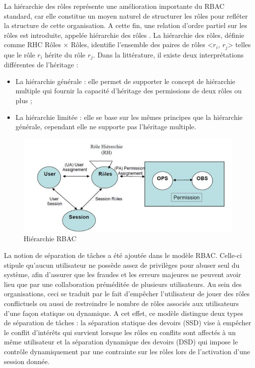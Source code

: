 \label{sectionHiérarchieRole}

La hiérarchie des rôles représente une amélioration importante du RBAC standard, car elle constitue un moyen naturel de structurer les rôles pour refléter la structure de cette organisation. A cette fin, une relation d'ordre partiel sur les rôles est introduite, appelée hiérarchie des rôles \cite{theseBenoit}. La hiérarchie des rôles, définie comme RHC Rôles × Rôles, identifie l'ensemble des paires de rôles <$r_{i}$, $r_{j}$> telles que le rôle $r_{i}$ hérite du rôle $r_{j}$. Dans la littérature, il existe deux interprétations différentes de l'héritage :
\begin{itemize}
\item La hiérarchie générale : elle permet de supporter le concept de hiérarchie multiple qui fournir la capacité d'héritage des permissions de deux rôles ou plus ;
\item La hiérarchie limitée : elle se base sur les mêmes principes que la hiérarchie générale, cependant elle ne supporte pas l'héritage multiple.
\end{itemize}

\begin{figure}[h!]
    \centering
		\includegraphics[scale=0.7]{chap2/images/HierachieRole.png}
    \caption{Hiérarchie RBAC \cite{bellettini01}}
	 \label{figHrbac}
\end{figure}

\label{sectionSéparationTache}

La notion de séparation de tâches a été ajoutée dans le modèle RBAC. Celle-ci stipule qu'aucun utilisateur ne possède assez de privilèges pour abuser seul du système, afin d'assurer que les fraudes et les erreurs majeures ne peuvent avoir lieu que par une collaboration préméditée de plusieurs utilisateurs. Au sein des organisations, ceci se traduit par le fait d'empêcher l'utilisateur de jouer des rôles conflictuels ou aussi de restreindre le nombre de rôles associés aux utilisateurs d'une façon statique ou dynamique. A cet effet, ce modèle distingue deux types de séparation de tâches \cite{sandhu96} : la séparation statique des devoirs (SSD) vise à empêcher le conflit d'intérêts qui survient lorsque les rôles en conflits sont affectés à un même utilisateur et la séparation dynamique des devoirs (DSD) qui impose le contrôle dynamiquement par une contrainte sur les rôles lors de l'activation d'une session donnée.


